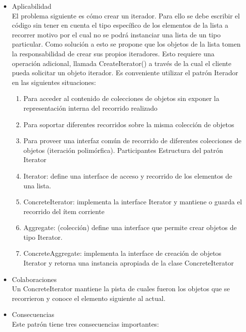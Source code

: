 \documentclass{article}
\begin{document}
\begin{enumerate}
\begin{itemize}
\begin{itemize}
\item{Aplicabilidad}\\

 El problema siguiente es cómo crear un iterador. Para ello se debe escribir el código sin tener en cuenta el tipo específico de los elementos de la lista a recorrer motivo por el cual no se podrá instanciar  una lista de un tipo particular. Como solución a esto se propone que los objetos de la lista tomen la responsabilidad de crear sus propios iteradores. Esto requiere una operación adicional, llamada CreateIterator() a través de la cual el cliente pueda solicitar un objeto iterador.
Es conveniente utilizar el patrón Iterador en las siguientes situaciones:
\begin{enumerate}
\item	Para acceder al contenido de colecciones de objetos sin exponer la representación interna del recorrido realizado
\item	Para soportar diferentes recorridos sobre la misma colección de objetos 
\item	Para proveer una interfaz común de recorrido de diferentes colecciones de objetos (iteración polimórfica).
Participantes 
 Estructura del patrón Iterator
\item	Iterator: define una interface de acceso y recorrido de los elementos de una lista.
\item	ConcreteIterator: implementa la interface Iterator y mantiene o guarda el recorrido del ítem corriente
\item	Aggregate: (colección) define una interface que permite crear objetos de tipo Iterator. 
\item	ConcreteAggregate: implementa la interface de creación de objetos Iterator y retorna una instancia apropiada de la clase ConcreteIterator
\end{enumerate}

\item{Colaboraciones}\\

Un ConcreteIterator mantiene la pista de cuales fueron los objetos que se recorrieron y conoce el elemento siguiente al actual. 


\item{Consecuencias}\\

Este patrón tiene tres consecuencias importantes:  


\end{itemize}
\end{itemize}
\end{enumerate}
\end{document}
